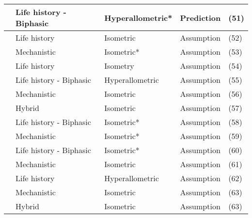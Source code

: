 \documentclass[a4paper]{article} %
\begin{document}
\begin{table}[H]
\begin{tabular}{|l|l|l|l|l|}
    \autocite{Quince2008b}                  & Life history - Biphasic   & Hyperallometric* & Prediction                        & (51)          \\ \hline
    \autocite{Pecquerie2009}                & Life history              & Isometric        & Assumption                        & (52)          \\ \hline
    \autocite{kooijman2010dynamic}          & Mechanistic               & Isometric*       & Assumption                        & (53)          \\ \hline
    \autocite{Arendt2011}                   & Life history              & Isometry         & Assumption                        & (54)          \\ \hline
    \autocite{Ohnishi2011}                  & Life history - Biphasic   & Hyperallometric  & Assumption                        & (55)          \\ \hline
    \autocite{Brunel2013}                   & Mechanistic               & Isometric        & Assumption                        & (56)          \\ \hline
    \autocite{Charnov2013}                  & Hybrid                    & Isometric        & Assumption                        & (57)          \\ \hline
    \autocite{Boukal2014}                   & Life history - Biphasic   & Isometric*       & Assumption                        & (58)          \\ \hline
    \autocite{Kooijman2014a}                & Mechanistic               & Isometric*       & Assumption                        & (59)          \\ \hline
    \autocite{Minte-Vera2016a}              & Life history - Biphasic   & Isometric*       & Assumption                        & (60)          \\ \hline
    \autocite{Jusup2017}                    & Mechanistic               & Isometric        & Assumption                        & (61)          \\ \hline
    \autocite{Mangel2017}                   & Life history              & Hyperallometric  & Assumption                        & (62)          \\ \hline
    \autocite{Smallegange2017}              & Mechanistic               & Isometric        & Assumption                        & (63)          \\ \hline
    \autocite{Audzijonyte2018}              & Hybrid                    & Isometric        & Assumption                        & (63)          \\ \hline

\end{tabular}
\end{table}
\end{document}
